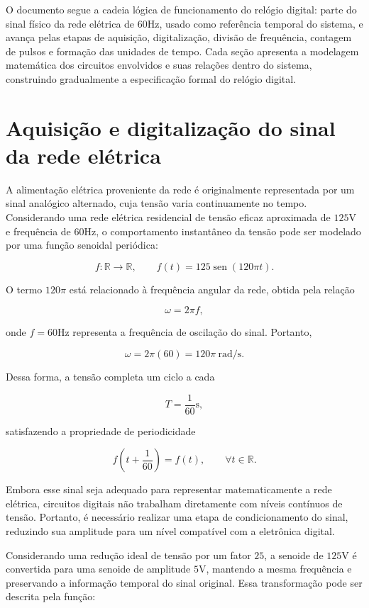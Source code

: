 \documentclass[a4paper,12pt]{article}
\DeclareMathOperator{\sen}{sen}
\begin{document}
O documento segue a cadeia lógica de funcionamento do relógio digital: parte do sinal físico da rede elétrica de 60Hz, usado como referência temporal do sistema, e avança pelas etapas de aquisição, digitalização, divisão de frequência, contagem de pulsos e formação das unidades de tempo. Cada seção apresenta a modelagem matemática dos circuitos envolvidos e suas relações dentro do sistema, construindo gradualmente a especificação formal do relógio digital.


\newpage


\section{Aquisição e digitalização do sinal da rede elétrica}

A alimentação elétrica proveniente da rede é originalmente representada por um sinal analógico alternado, cuja tensão varia continuamente no tempo. Considerando uma rede elétrica residencial de tensão eficaz aproximada de \(125\)V e frequência de \(60\)Hz, o comportamento instantâneo da tensão pode ser modelado por uma função senoidal periódica:

\[
f : \mathbb{R} \to \mathbb{R}, \qquad f(t)=125\sen(120\pi t).
\]

O termo \(120\pi\) está relacionado à frequência angular da rede, obtida pela relação

\[
\omega = 2\pi f,
\]

onde \(f=60\)Hz representa a frequência de oscilação do sinal. Portanto,

\[
\omega = 2\pi(60)=120\pi \ \text{rad/s}.
\]

Dessa forma, a tensão completa um ciclo a cada

\[
T=\frac{1}{60}\text{s},
\]

satisfazendo a propriedade de periodicidade

\[
f\left(t+\frac{1}{60}\right)=f(t), \qquad \forall t\in\mathbb{R}.
\]

Embora esse sinal seja adequado para representar matematicamente a rede elétrica, circuitos digitais não trabalham diretamente com níveis contínuos de tensão. Portanto, é necessário realizar uma etapa de condicionamento do sinal, reduzindo sua amplitude para um nível compatível com a eletrônica digital.

Considerando uma redução ideal de tensão por um fator \(25\), a senoide de \(125\)V é convertida para uma senoide de amplitude \(5\)V, mantendo a mesma frequência e preservando a informação temporal do sinal original. Essa transformação pode ser descrita pela função:
\end{document}
